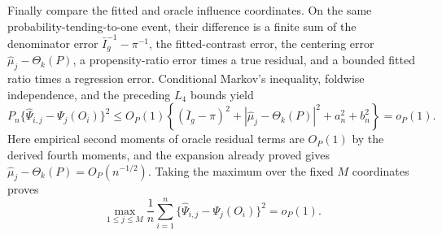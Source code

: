 Finally compare the fitted and oracle influence coordinates. On the same probability-tending-to-one event, their difference is a finite sum of the denominator error \(\bar I_g^{-1}-\pi^{-1}\), the fitted-contrast error, the centering error \(\widehat\mu_j-\Theta_k(P)\), a propensity-ratio error times a true residual, and a bounded fitted ratio times a regression error. Conditional Markov's inequality, foldwise independence, and the preceding \(L_4\) bounds yield
\[
 P_n\{\widehat\Psi_{i,j}-\Psi_j(O_i)\}^2
 \le O_P(1)\left\{(\bar I_g-\pi)^2
 +|\widehat\mu_j-\Theta_k(P)|^2+a_n^2+b_n^2\right\}=o_P(1).
\]
Here empirical second moments of oracle residual terms are \(O_P(1)\) by the derived fourth moments, and the expansion already proved gives \(\widehat\mu_j-\Theta_k(P)=O_P(n^{-1/2})\). Taking the maximum over the fixed \(M\) coordinates proves
\[
 \max_{1\le j\le M}\frac1n\sum_{i=1}^n
 \{\widehat\Psi_{i,j}-\Psi_j(O_i)\}^2=o_P(1).
\]